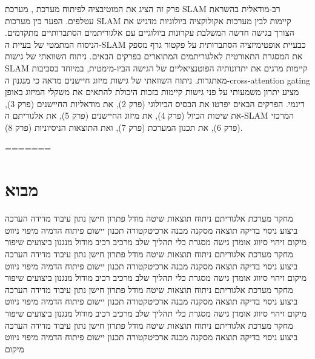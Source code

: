 פרק זה הציג את המוטיבציה לפיתוח מערכת , מערכת SLAM רב-מודאלית בהשראת עטלפים. הפער בין מערכות SLAM קיימות לבין מערכות אקולוקציה ביולוגיות מדגיש את הצורך בגישה חדשה המשלבת עקרונות ביולוגיים עם אלגוריתמים הסתברותיים מתקדמים. הניסוח המתמטי של בעיית ה-SLAM כבעיית אופטימיזציה הסתברותית על פקטור גרף מספק את המסגרת התאורטית לאלגוריתמים המתוארים בפרקים הבאים. ניתוח השוואתי של גישות SLAM קיימות מדגים את יתרונותיה הפוטנציאליים של הגישה הביו-מימטית, במיוחד בסביבות מאתגרות. ניתוח השוואתי של גישות מיזוג חיישנים מראה כי מנגנון ה-cross-attention gating מציע יתרון משמעותי על פני גישות קיימות בזכות היכולת להתאים את משקלי המיזוג באופן דינמי. הפרקים הבאים יפרטו את הבסיס הביולוגי (פרק 2), את מודאליות החיישנים (פרק 3), את שיטות הכיול (פרק 4), את מיזוג החיישנים (פרק 5), את אלגוריתם ה-SLAM המרכזי (פרק 6), את תכנון המערכת (פרק 7), ואת התוצאות הניסיוניות (פרק 8).

\cite{Campos2021ORBSLAM3, Teed2021DROIDSLAM, Xu2022FASTLIO2, Shan2020LIOSAM, Zhang2014LOAM, Zuo2020LICFusion, Kaess2012iSAM2, BenDavid2022Adaptive, Schnitzler1968DSC, Schuller1974DSC, Simmons1979BatSonar}
=======
\section{מבוא}
\label{sec:ch01}

מחקר מערכת אלגוריתם ניתוח תוצאות שיטה מודל פתרון חישן נתון עיבוד מדידה הערכה ביצוע ניסוי בדיקה תוצאה מסקנה מבנה ארכיטקטורה תכנון יישום פיתוח הדמיה מיפוי ניווט מיקום זיהוי סיווג אומדן גישה מסגרת כלי תהליך שלב מרכיב רכיב מודול מנגנון ביצועים שיפור מחקר מערכת אלגוריתם ניתוח תוצאות שיטה מודל פתרון חישן נתון עיבוד מדידה הערכה ביצוע ניסוי בדיקה תוצאה מסקנה מבנה ארכיטקטורה תכנון יישום פיתוח הדמיה מיפוי ניווט מיקום זיהוי סיווג אומדן גישה מסגרת כלי תהליך שלב מרכיב רכיב מודול מנגנון ביצועים שיפור מחקר מערכת אלגוריתם ניתוח תוצאות שיטה מודל פתרון חישן נתון עיבוד מדידה הערכה ביצוע ניסוי בדיקה תוצאה מסקנה מבנה ארכיטקטורה תכנון יישום פיתוח הדמיה מיפוי ניווט מיקום זיהוי סיווג אומדן גישה מסגרת כלי תהליך שלב מרכיב רכיב מודול מנגנון ביצועים שיפור מחקר מערכת אלגוריתם ניתוח תוצאות שיטה מודל פתרון חישן נתון עיבוד מדידה הערכה ביצוע ניסוי בדיקה תוצאה מסקנה מבנה ארכיטקטורה תכנון יישום פיתוח הדמיה מיפוי ניווט מיקום

